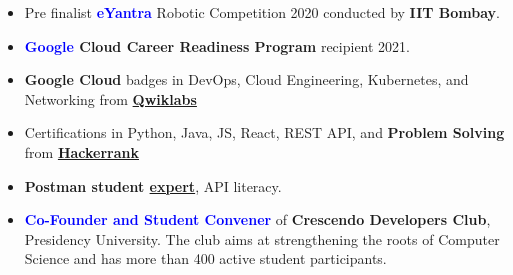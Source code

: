 \begin{itemize}
\item Pre finalist \textbf{\textcolor{blue}{eYantra}} Robotic Competition 2020 conducted by \textbf{IIT Bombay}.
\item \textbf{\textcolor{blue}{Google} Cloud Career Readiness Program} recipient 2021.
\item \textbf{Google Cloud} badges in DevOps, Cloud Engineering, Kubernetes, and Networking from \textbf{\textcolor{blue}{\href{https://www.qwiklabs.com/public_profiles/c11f5195-2ad0-4404-83c4-08ad982d139c}{Qwiklabs}}}
\item Certifications in Python, Java, JS, React, REST API, and \textbf{Problem Solving} from 
\textbf{\textcolor{blue}{\href{https://www.hackerrank.com/shaiqkar}{Hackerrank}}}
\item \textbf{Postman student \textcolor{blue}{\href{https://shrtst.herokuapp.com/R3io}{expert}}}, API literacy.
\end{itemize}
\smallskip

\begin{itemize}
\item \textbf{\textcolor{blue}{Co-Founder and Student Convener}} of \textbf{Crescendo Developers Club}, Presidency University. The club aims at strengthening the roots of Computer Science and has more than 400 active student participants.
\end{itemize}